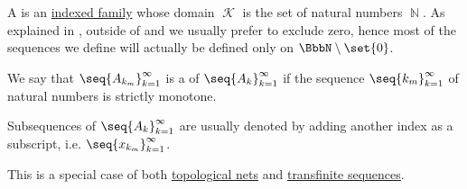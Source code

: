 \begin{definition}\label{def:sequence}
  A  is an \hyperref[def:indexed_family]{indexed family} whose domain \( \mscrK \) is the set of natural numbers \( \BbbN \). As explained in , outside of  and  we usually prefer to exclude zero, hence most of the sequences we define will actually be defined only on \( \BbbN \setminus \set{ 0 } \).

  We say that \( \seq{ A_{k_m} }_{k=1}^\infty \) is a  of \( \seq{ A_k }_{k=1}^\infty \) if the sequence \( \seq{ k_m }_{k=1}^\infty \) of natural numbers is strictly monotone.

  Subsequences of \( \seq{ A_k }_{k=1}^\infty \) are usually denoted by adding another index as a subscript, i.e. \( \seq{ x_{k_m} }_{k=1}^\infty \).

  This is a special case of both \hyperref[def:topological_net]{topological nets} and \hyperref[def:transfinite_sequence]{transfinite sequences}.
\end{definition}

